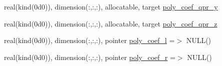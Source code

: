 \begin{Indent}
\begin{DoxyCompactItemize}
real(kind(0d0)), dimension(\+:,\+:,\+:), allocatable, target \hyperlink{namespacem__weno_a2e122ffcf340d423036ed315caae26cd}{poly\+\_\+coef\+\_\+qpr\+\_\+y}
\item 
real(kind(0d0)), dimension(\+:,\+:,\+:), allocatable, target \hyperlink{namespacem__weno_af8ee85fbadf8c00f10e2f57050bf38c6}{poly\+\_\+coef\+\_\+qpr\+\_\+z}
\item 
real(kind(0d0)), dimension(\+:,\+:,\+:), pointer \hyperlink{namespacem__weno_a139be4d526326088bbeb2fb41ccea127}{poly\+\_\+coef\+\_\+l} =$>$ N\+U\+LL()
\item 
real(kind(0d0)), dimension(\+:,\+:,\+:), pointer \hyperlink{namespacem__weno_a2e98c94233f9445dde8b9a86687e12c8}{poly\+\_\+coef\+\_\+r} =$>$ N\+U\+LL()
\end{DoxyCompactItemize}
\end{Indent}
